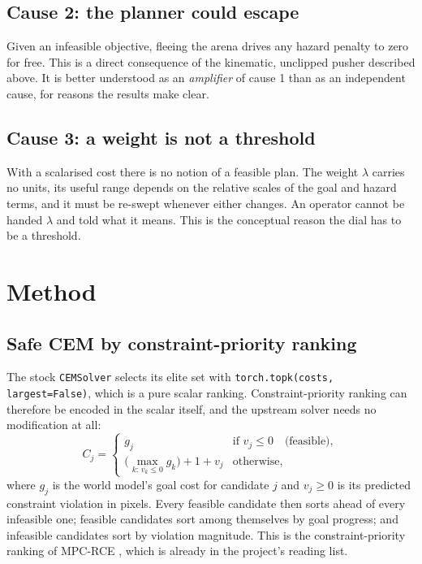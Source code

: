 \documentclass[11pt,a4paper]{article}
\begin{document}
\subsection{Cause 2: the planner could escape}

Given an infeasible objective, fleeing the arena drives any hazard penalty to zero for free.
This is a direct consequence of the kinematic, unclipped pusher described above. It is better
understood as an \emph{amplifier} of cause 1 than as an independent cause, for reasons the
results make clear.

\subsection{Cause 3: a weight is not a threshold}

With a scalarised cost there is no notion of a feasible plan. The weight $\lambda$ carries no
units, its useful range depends on the relative scales of the goal and hazard terms, and it
must be re-swept whenever either changes. An operator cannot be handed $\lambda$ and told what
it means. This is the conceptual reason the dial has to be a threshold.

\section{Method}

\subsection{Safe CEM by constraint-priority ranking}

The stock \texttt{CEMSolver} selects its elite set with
\texttt{torch.topk(costs, largest=False)}, which is a pure scalar ranking. Constraint-priority
ranking can therefore be encoded in the scalar itself, and the upstream solver needs no
modification at all:
\[
  C_j =
  \begin{cases}
    g_j & \text{if } v_j \le 0 \quad \text{(feasible)},\\[2pt]
    \big(\max_{k:\, v_k \le 0} g_k\big) + 1 + v_j & \text{otherwise},
  \end{cases}
\]
where $g_j$ is the world model's goal cost for candidate $j$ and $v_j \ge 0$ is its predicted
constraint violation in pixels. Every feasible candidate then sorts ahead of every infeasible
one; feasible candidates sort among themselves by goal progress; and infeasible candidates
sort by violation magnitude. This is the constraint-priority ranking of MPC-RCE
\parencite{liu2020constrained}, which is already in the project's reading list.
\end{document}
